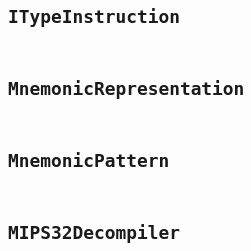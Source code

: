     \begin{landscape}
    \section{\texttt{ITypeInstruction}}\label{code:ITypeInstruction}
    \begin{multicols}{2} %
    \inputminted[mathescape,
        linenos,
        numbersep=5pt,
        frame=none,
        framesep=2mm,
        fontsize=\footnotesize]{java}{../src/main/java/se/filipallberg/dark/mips32decompiler/instruction/type/ITypeInstruction/ITypeInstruction.java}
    \end{multicols}
    \end{landscape}
    


    \begin{landscape}
    \section{\texttt{MnemonicRepresentation}}\label{code:MnemonicRepresentation}
    \begin{multicols}{2} %
    \inputminted[mathescape,
        linenos,
        numbersep=5pt,
        frame=none,
        framesep=2mm,
        fontsize=\footnotesize]{java}{../src/main/java/se/filipallberg/dark/mips32decompiler/instruction/mnemonic/MnemonicRepresentation.java}
    \end{multicols}
    \end{landscape}
    


    \begin{landscape}
    \section{\texttt{MnemonicPattern}}\label{code:MnemonicPattern}
    \begin{multicols}{2} %
    \inputminted[mathescape,
        linenos,
        numbersep=5pt,
        frame=none,
        framesep=2mm,
        fontsize=\footnotesize]{java}{../src/main/java/se/filipallberg/dark/mips32decompiler/instruction/mnemonic/MnemonicPattern.java}
    \end{multicols}
    \end{landscape}
    


    \begin{landscape}
    \section{\texttt{MIPS32Decompiler}}\label{code:MIPS32Decompiler}
    \begin{multicols}{2} %
    \inputminted[mathescape,
        linenos,
        numbersep=5pt,
        frame=none,
        framesep=2mm,
        fontsize=\footnotesize]{java}{../src/main/java/se/filipallberg/dark/mips32decompiler/MIPS32Decompiler.java}
    \end{multicols}
    \end{landscape}
    


